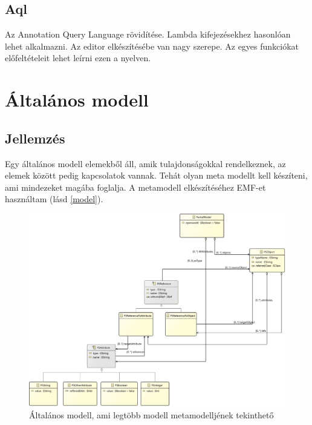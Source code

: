 \subsection{Aql}
\nocite{Acceleo}
\nocite{OCL}
Az Annotation Query Language \cite{Aql} rövidítése. Lambda \cite{Lambda} kifejezésekhez hasonlóan lehet alkalmazni. 
Az editor elkészítésébe van nagy szerepe. Az egyes funkciókat előfeltételeit lehet leírni ezen a nyelven. 


\section{Általános modell}

\subsection{Jellemzés}
Egy általános modell elemekből áll, amik tulajdonságokkal rendelkeznek, az elemek között pedig kapcsolatok vannak. Tehát olyan meta modellt kell készíteni, ami mindezeket magába foglalja. A metamodell elkészítéséhez EMF-et használtam (lásd \autoref{model}).

\begin{figure}[!ht]
	\centering
	\includegraphics[width=150mm]{figures/partialmodel01.pdf}
	\caption{Általános modell, ami legtöbb modell metamodelljének tekinthető} 
	\label{model}
\end{figure}

